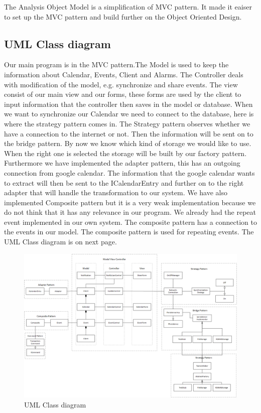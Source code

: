 The Analysis Object Model is a simplification of MVC pattern. It made it eaiser to set up the MVC pattern and build further on the Object Oriented Design. 

\subsection*{UML Class diagram}
Our main program is in the MVC pattern.The Model is used to keep the information about Calendar, Events, Client and Alarms. The Controller deals with modification of the model, e.g. synchronize and share events. The view consist of our main view and our forms, these forms are used by the client to input information that the controller then saves in the model or database.
When we want to synchronize our Calendar we need to connect to the database, here is where the strategy pattern comes in. The Strategy pattern observes whether we have a connection to the internet or not. Then the information will be sent on to the bridge pattern. By now we know which kind of storage we would like to use. When the right one is selected the storage will be built by our factory pattern. 
Furthermore we have implemented the adapter pattern, this has an outgoing connection from google calendar. The information that the google calendar wants to extract will then be sent to the ICalendarEntry and further on to the right adapter that will handle the transformation to our system. 
We have also implemented Composite pattern but it is a very weak implementation because we do not think that it has any relevance in our program. We already had the repeat event implemented in our own system. The composite pattern has a connection to the events in our model. The composite pattern is used for repeating events.
\newline
The UML Class diagram is on next page.

\begin{figure}
\centering
\includegraphics[width=210mm]{class.png}
\caption{UML Class diagram \label{overflow}}
\end{figure}


